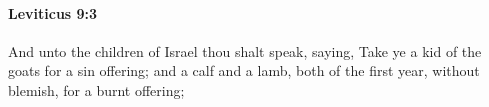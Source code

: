 
		\paragraph{Leviticus 9:3} %
			\label{LEVITICUS-9-3}

			And unto the children of Israel thou shalt speak, saying, Take ye a kid of the goats for a sin offering; and a calf and a lamb, both of the first year, without blemish, for a burnt offering;


